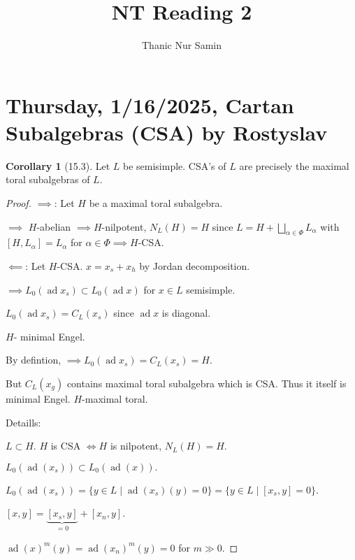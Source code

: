 \documentclass{article}
\title{NT Reading 2}
\author{Thanic Nur Samin}
\date{\vspace{-5ex}}
\theoremstyle{definition}
\newtheorem{corollary}[theorem]{Corollary}
\begin{document}
    \maketitle

    \tableofcontents

    \setcounter{section}{8}

    \section{Thursday, 1/16/2025, Cartan Subalgebras (CSA) by Rostyslav}

    \begin{corollary}
        [15.3] Let \(L\) be semisimple. CSA's of \(L\) are precisely the maximal toral subalgebras of \(L\).
    \end{corollary}

    \begin{proof}
        \(\implies\): Let \(H\) be a maximal toral subalgebra.

        \(\implies\) \(H\)-abelian \(\implies H\)-nilpotent, \(N_L(H) = H\) since \(L = H + \bigsqcup_{\alpha\in \Phi} L_\alpha\) with \([H,L_\alpha] = L_\alpha\) for \(\alpha \in \Phi \implies H\)-CSA.
        
        \(\impliedby\): Let \(H\)-CSA. \(x = x_s + x_h\) by Jordan decomposition.

        \(\implies L_0(\operatorname{ad} x_s) \subset L_0(\operatorname{ad} x)\) for \(x\in L\) semisimple.

        \(L_0(\operatorname{ad} x_s) = C_L(x_s)\) since \(\operatorname{ad} x\) is diagonal.
        
        \(H\)- minimal Engel.

        By defintion, \(\implies L_0(\operatorname{ad} x_s) = C_L(x_s) = H\).
        
        But \(C_L(x_g)\) contains maximal toral subalgebra which is CSA. Thus it itself is minimal Engel. \(H\)-maximal toral.

        Detaills:

        \(L \subset H\). \(H\) is CSA \(\iff H\) is nilpotent, \(N_L(H)=H\).


        \(L_0(\operatorname{ad}(x_s)) \subset L_0(\operatorname{ad}(x)).\)
        
        \(L_0(\operatorname{ad}(x_s)) = \{ y\in L \mid \operatorname{ad}(x_s)(y) = 0\} = \{ y\in L \mid [x_s,y] = 0 \} \).
        
        \([x,y] = \underbrace{[x_s,y]}_{=0} + [x_n,y]\).

        \(\operatorname{ad}(x)^m(y) = \operatorname{ad}(x_n)^m(y) = 0\) for \(m \gg 0\).
        
    \end{proof}
\end{document}
